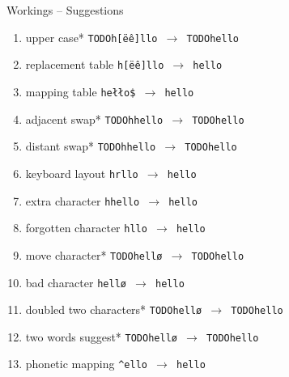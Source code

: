 \documentclass{beamer}
\begin{document}
\begin{frame}{Workings – Suggestions}
\begin{enumerate}
\item upper case* \hfill \texttt{TODOh\alert{[ëê]}llo $\rightarrow$ TODOh\alert{e}llo}
\item replacement table \hfill \texttt{h\alert{[ëê]}llo $\rightarrow$ h\alert{e}llo}
\item mapping table \hfill \texttt{he\alert{łło\$} $\rightarrow$ he\alert{llo}}
\item adjacent swap* \hfill \texttt{TODOh\alert{h}ello $\rightarrow$ TODOhello}
\item distant swap* \hfill \texttt{TODOh\alert{h}ello $\rightarrow$ TODOhello}
\item keyboard layout \hfill \texttt{h\alert{r}llo $\rightarrow$ h\alert{e}llo}
\item extra character \hfill \texttt{h\alert{h}ello $\rightarrow$ hello}
\item forgotten character \hfill \texttt{hllo $\rightarrow$ h\alert{e}llo}
\item move character* \hfill \texttt{TODOhell\alert{ø} $\rightarrow$ TODOhell\alert{o}}
\item bad character \hfill \texttt{hell\alert{ø} $\rightarrow$ hell\alert{o}}
\item doubled two characters* \hfill \texttt{TODOhell\alert{ø} $\rightarrow$ TODOhell\alert{o}}
\item two words suggest* \hfill \texttt{TODOhell\alert{ø} $\rightarrow$ TODOhell\alert{o}}
\item phonetic mapping \hfill \texttt{\alert{\^{}el}lo $\rightarrow$ \alert{hel}lo}
\end{enumerate}
\end{frame}
\end{document}
